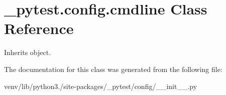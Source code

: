 \hypertarget{class__pytest_1_1config_1_1cmdline}{}\section{\+\_\+pytest.\+config.\+cmdline Class Reference}
\label{class__pytest_1_1config_1_1cmdline}


Inherits object.



The documentation for this class was generated from the following file\+:\begin{DoxyCompactItemize}
\item 
venv/lib/python3./site-\/packages/\+\_\+pytest/config/\+\_\+\+\_\+init\+\_\+\+\_\+.\+py\end{DoxyCompactItemize}
